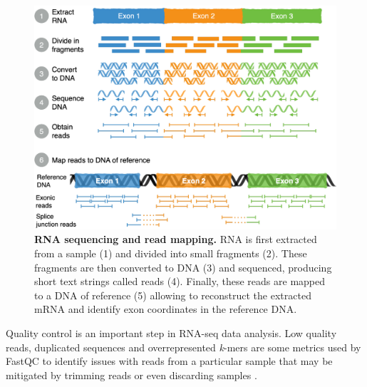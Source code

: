 \begin{figure}[!htb]
  \centering
  \includegraphics[width=.7\linewidth]{images/intro/rna-seq}
  \caption[RNA sequencing and read mapping]{\textbf{RNA sequencing and read mapping.} RNA is first extracted from a sample (1) and divided into small fragments (2). These fragments are then converted to DNA (3) and sequenced, producing short text strings called reads (4). Finally, these reads are mapped to a DNA of reference (5) allowing to reconstruct the extracted mRNA and identify exon coordinates in the reference DNA.}
  \label{fig:RNAseq}
\end{figure}



Quality control is an important step in RNA-seq data analysis. Low quality reads, duplicated sequences and overrepresented \emph{k}-mers are some metrics used by FastQC to identify issues with reads from a particular sample that may be mitigated by trimming reads or even discarding samples \cite{andrews:2019vg}. %

